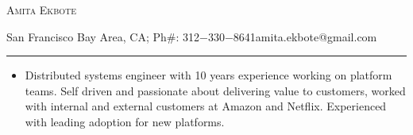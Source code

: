 \documentclass[10pt,oneside]{article}
\makeatletter
\newcommand{\name}{Amita Ekbote}
\newcommand{\addr}{San Francisco Bay Area, CA}
\newcommand{\phone}{312$-$330$-$8641}
\newcommand{\email}{amita.ekbote@gmail.com}
\newcommand{\bigname}[1]{\begin{center}\Huge\scshape#1\end{center}}
\makeatother
\begin{document}
\bigname{\name}
{\small \addr; Ph#: \phone\hfill\email}
\vspace{0pt}
\rule[3mm]{\textwidth}{1pt}

\vspace{-10 pt}

{}


  \begin{itemize}
      \item Distributed systems engineer with 10 years experience working on platform teams.
      Self driven and passionate about delivering value to customers, worked with internal and external customers at Amazon and Netflix.
      Experienced with leading adoption for new platforms.
  \end{itemize}
\end{document}
